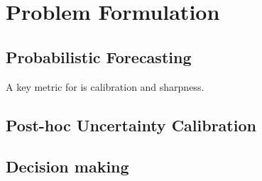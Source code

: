 \section{Problem Formulation}
\label{sec:intro_problem}

\subsection{Probabilistic Forecasting}

A key metric for  is calibration and sharpness.

\subsection{Post-hoc Uncertainty Calibration}

\subsection{Decision making}